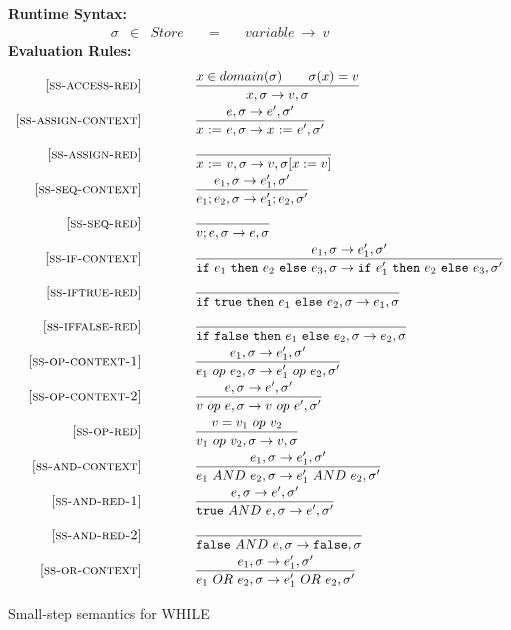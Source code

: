 \documentclass{article}
\begin{document}
\begin{figure}
\caption{Small-step semantics for WHILE}
{\bf Runtime Syntax:}
\[
\begin{array}{rclcl}
  \sigma & \in & {Store} \quad  & = & \quad {variable} ~\rightarrow ~v
\end{array}
\]
{\bf Evaluation Rules:~~~ } \\
\[
\begin{array}{r@{\qquad\qquad}l}

\ssrule{ss-access-red}{
    x \in domain(\sigma) \qquad \sigma(x)=v
}{
    \sstep{x}{\sigma}{v}{\sigma}
}

\ssrule{ss-assign-context}{
    \sstep{e}{\sigma}{e'}{\sigma'}
}{
    \sstep{\assign{x}{e}}{\sigma}{\assign{x}{e'}}{\sigma'}
}

\ssrule{ss-assign-red}{
}{
    \sstep{\assign{x}{v}}{\sigma}{v}{\sigma[x:=v]}
}

\ssrule{ss-seq-context}{
    \sstep{e_1}{\sigma}{e_1'}{\sigma'}
}{
    \sstep{e_1;e_2}{\sigma}{e_1';e_2}{\sigma'}
}

\ssrule{ss-seq-red}{
}{
  \sstep{v;e}{\sigma}{e}{\sigma}
}


\ssrule{ss-if-context}{
 \sstep{e_1}{\sigma}{e_1'}{\sigma'}
}{
  \sstep{\ife{e_1}{e_2}{e_3}}{\sigma}{\ife{e_1'}{e_2}{e_3}}{\sigma'}
}


\ssrule{ss-iftrue-red}{
}{
  \sstep{\ife{\true}{e_1}{e_2}}{\sigma}{e_1}{\sigma}
}

\ssrule{ss-iffalse-red}{
}{
  \sstep{\ife{\false}{e_1}{e_2}}{\sigma}{e_2}{\sigma}
}

\ssrule{ss-op-context-1}{
  \sstep{e_1}{\sigma}{e_1'}{\sigma'}
}{
  \sstep{e_1~op~e_2}{\sigma}{e_1'~op~e_2}{\sigma'}
}

\ssrule{ss-op-context-2}{
  \sstep{e}{\sigma}{e'}{\sigma'}
}{
  \sstep{v~op~e}{\sigma}{v~op~e'}{\sigma'}
}

\ssrule{ss-op-red}{
  v = v_1 ~op~ v_2
}{
  \sstep{v_1~op~v_2}{\sigma}{v}{\sigma}
}

\ssrule{ss-and-context}{
  \sstep{e_1}{\sigma}{e_1'}{\sigma'}
}{
  \sstep{e_1~AND~e_2}{\sigma}{e_1'~AND~e_2}{\sigma'}
}

\ssrule{ss-and-red-1}{
  \sstep{e}{\sigma}{e'}{\sigma'}
}{
  \sstep{\true~AND~e}{\sigma}{e'}{\sigma'}
}

\ssrule{ss-and-red-2}{
}{
  \sstep{\false~AND~e}{\sigma}{\false}{\sigma}
}

\ssrule{ss-or-context}{
  \sstep{e_1}{\sigma}{e_1'}{\sigma'}
}{
  \sstep{e_1~OR~e_2}{\sigma}{e_1'~OR~e_2}{\sigma'}
}


\end{array}\]
\end{figure}
\end{document}
